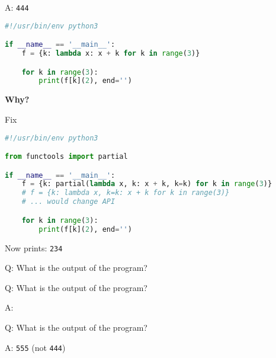 \begin{frame}[fragile]{A: \texttt{444}}
    \begin{lstlisting}[language=python]
#!/usr/bin/env python3

if __name__ == '__main__':
    f = {k: lambda x: x + k for k in range(3)}

    for k in range(3):
        print(f[k](2), end='')
    \end{lstlisting}

    \hfill \textbf{Why?} 
\end{frame}

\begin{frame}[fragile]{Fix}
    \begin{lstlisting}[language=python]
#!/usr/bin/env python3

from functools import partial

if __name__ == '__main__':
    f = {k: partial(lambda x, k: x + k, k=k) for k in range(3)}
    # f = {k: lambda x, k=k: x + k for k in range(3)}
    # ... would change API

    for k in range(3):
        print(f[k](2), end='')
    \end{lstlisting}
    
    Now prints: \texttt{234}
\end{frame}

\begin{frame}[fragile]{Q: What is the output of the program?}

\end{frame}

\begin{frame}[fragile]{Q: What is the output of the program?}
\end{frame}

\begin{frame}[fragile]{A: }
\end{frame}

\begin{frame}[fragile]{Q: What is the output of the program?}
\end{frame}

\begin{frame}[fragile]{A: \texttt{555} (not \texttt{444})}
\end{frame}

